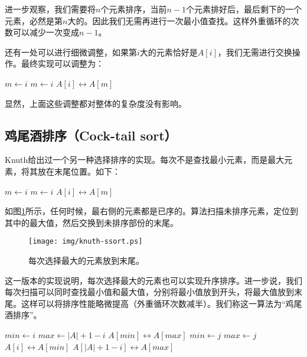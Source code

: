 \documentclass[UTF8]{article}
\begin{document}
进一步观察，我们需要将$n$个元素排序，当前$n-1$个元素排好后，最后剩下的一个元素，必然是第$n$大的。因此我们无需再进行一次最小值查找。这样外重循环的次数可以减少一次变成$n-1$。

还有一处可以进行细微调整，如果第$i$大的元素恰好是$A[i]$，我们无需进行交换操作。最终实现可以调整为：

\begin{algorithmic}
    \State $m \gets i$
        \State $m \gets i$
      \EndIf
    \EndFor
      \State {} $A[i] \leftrightarrow A[m]$
    \EndIf
  \EndFor
\EndProcedure
\end{algorithmic}

显然，上面这些调整都对整体的复杂度没有影响。

\subsection{鸡尾酒排序（Cock-tail sort）}

Knuth给出过一个另一种选择排序的实现\cite{TAOCP}。每次不是查找最小元素，而是最大元素，将其放在末尾位置。如下：

\begin{algorithmic}
    \State $m \gets i$
        \State $m \gets i$
      \EndIf
    \EndFor
    \State {} $A[i] \leftrightarrow A[m]$
  \EndFor
\EndProcedure
\end{algorithmic}

如图\ref{fig:knuth-ssort}所示，任何时候，最右侧的元素都是已序的。算法扫描未排序元素，定位到其中的最大值，然后交换到未排序部份的末尾。

\begin{figure}[htbp]
  \centering
  \texttt{[image: img/knuth-ssort.ps]}
  \caption{每次选择最大的元素放到末尾。}
  \label{fig:knuth-ssort}
\end{figure}

这一版本的实现说明，每次选择最大的元素也可以实现升序排序。进一步说，我们每次扫描可以同时查找最小值和最大值，分别将最小值放到开头，将最大值放到末尾。这样可以将排序性能略微提高（外重循环次数减半）。我们称这一算法为“鸡尾酒排序”。

\begin{algorithmic}
    \State $min \gets i$
    \State $max \gets |A| + 1 - i$
      \State {} $A[min] \leftrightarrow A[max]$
    \EndIf
        \State $min \gets j$
      \EndIf
        \State $max \gets j$
      \EndIf
    \EndFor
    \State {} $A[i] \leftrightarrow A[min]$
    \State {} $A[|A|+1-i] \leftrightarrow A[max]$
  \EndFor
\EndProcedure
\end{algorithmic}
\end{document}

